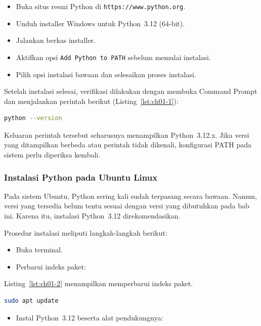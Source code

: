 \begin{itemize}
  \item Buka situs resmi Python di \texttt{https://www.python.org}.
  \item Unduh installer Windows untuk Python~3.12 (64-bit).
  \item Jalankan berkas installer.
  \item Aktifkan opsi \texttt{Add Python to PATH} sebelum memulai instalasi.
  \item Pilih opsi instalasi bawaan dan selesaikan proses instalasi.
\end{itemize}

Setelah instalasi selesai, verifikasi dilakukan dengan membuka Command Prompt dan
menjalankan perintah berikut (Listing~\ref{lst:ch01-1}):

\begin{lstlisting}[language=bash, caption={Memeriksa versi Python}, label={lst:ch01-1}]
python --version
\end{lstlisting}

Keluaran perintah tersebut seharusnya menampilkan Python~3.12.x. Jika versi yang
ditampilkan berbeda atau perintah tidak dikenali, konfigurasi PATH pada sistem
perlu diperiksa kembali.


\subsubsection{Instalasi Python pada Ubuntu Linux}

Pada sistem Ubuntu, Python sering kali sudah terpasang secara bawaan. Namun,
versi yang tersedia belum tentu sesuai dengan versi yang dibutuhkan pada bab ini.
Karena itu, instalasi Python~3.12 direkomendasikan.

Prosedur instalasi meliputi langkah-langkah berikut:

\begin{itemize}
  \item Buka terminal.
  \item Perbarui indeks paket:
\end{itemize}


Listing~\ref{lst:ch01-2} menampilkan memperbarui indeks paket.
\begin{lstlisting}[language=bash, caption={Memperbarui indeks paket}, label={lst:ch01-2}]
sudo apt update
\end{lstlisting}

\begin{itemize}
  \item Instal Python~3.12 beserta alat pendukungnya:
\end{itemize}


